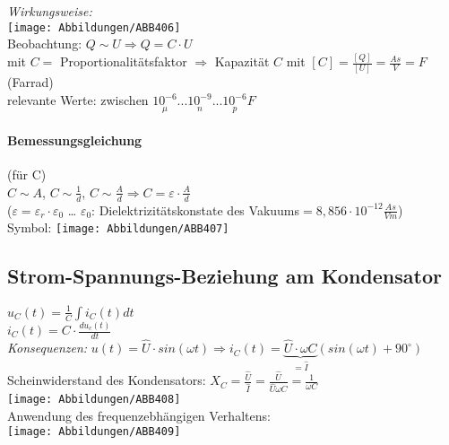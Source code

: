 \documentclass{scrreprt}
\begin{document}
\emph{Wirkungsweise:}\\
\texttt{[image: Abbildungen/ABB406]}\\
Beobachtung: $Q\sim U \Rightarrow Q=C\cdot U$ \\
mit $C = $ Proportionalitätsfaktor $\Rightarrow$ Kapazität $C$ mit $[C]=\frac{[Q]}{[U]}=\frac{As}{V}=F$ (Farrad)\\
relevante Werte: zwischen $\underset{\mu}{10^{-6}}... \underset{n}{10^{-9}}...\underset{p}{10^{-6}}F$
\paragraph{Bemessungsgleichung} (für C)\\
$C \sim A$, $C\sim \frac{1}{d}$, $C\sim  \frac{A}{d} \Rightarrow C=\varepsilon \cdot \frac{A}{d}$ \\
($\varepsilon = \varepsilon_r \cdot \varepsilon_0$ … $\varepsilon_0$: Dielektrizitätskonstate des Vakuums$=8,856\cdot 10^{-12}\frac{As}{Vm}$)\\
Symbol: \texttt{[image: Abbildungen/ABB407]}
\subsection{Strom-Spannungs-Beziehung am Kondensator}
$u_C(t)=\frac{1}{C}\int i_C(t) dt$\\
$i_C(t)=C\cdot \frac{du_c(t)}{dt}$\\
\emph{Konsequenzen:} $u(t)=\hat{U}\cdot sin (\omega t) \Rightarrow i_C(t)=\underbrace{\hat{U}\cdot \omega C}_{=\hat{I}}(sin (\omega t) + 90^{\circ})$\\
Scheinwiderstand des Kondensators: $X_C=\frac{\hat{U}}{\hat{I}}=\frac{\hat{U}}{\hat{U}\omega C}=\frac{1}{\omega C}$\\
\texttt{[image: Abbildungen/ABB408]}\\
Anwendung des frequenzebhängigen Verhaltens:\\
\texttt{[image: Abbildungen/ABB409]}




\end{document}
